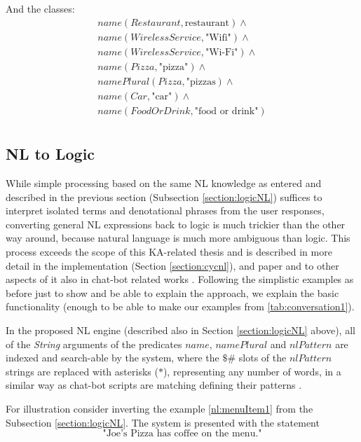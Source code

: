 And the classes:
\begin{equation}\label{as:nl:classes}
\begin{gathered}
    name(Restaurant, \text{restaurant}) \land \\
    name(WirelessService, \text{"Wifi"}) \land \\
    name(WirelessService, \text{"Wi-Fi"}) \land \\
	name(Pizza, \text{"pizza"}) \land \\
	namePlural(Pizza, \text{"pizzas}) \land \\
	name(Car, \text{"car"}) \land \\
	name(FoodOrDrink, \text{"food or drink"}) \\
\end{gathered}
\end{equation}

\subsection{NL to Logic}
\label{section:NLLogic}
While simple processing based on the same NL knowledge as entered and described
in the previous section (Subsection \ref{section:logicNL}) suffices to interpret 
isolated terms and denotational phrases from the user responses, converting 
general NL expressions back to logic is much trickier than the other way 
around, because natural language is much more ambiguous than logic. This 
process exceeds the scope of this KA-related thesis and is 
described in more detail in the implementation (Section \ref{section:cycnl}), 
and paper \parencite{Schneider2015} and to other aspects of it also in chat-bot related works \parencite{Wallace2013,Wilcox2011}. Following the simplistic examples as
before just to show and be able to explain the approach, we explain the basic 
functionality (enough to be able to make our examples from 
\autoref{tab:conversation1}).

In the proposed NL engine (described also in Section \ref{section:logicNL}
above), all of the \emph{String} arguments of the predicates $name$, 
$namePlural$ and $nlPattern$ are indexed and search-able by the system, where
the $\$\#$ slots of the $nlPattern$ strings are replaced with asterisks ($*$),
representing any number of words, in a similar way as chat-bot scripts are
matching defining their patterns \parencite{Wilcox2011}.

For illustration consider inverting the example \ref{nl:menuItem1} from the
Subsection \ref{section:logicNL}. The system is presented with the statement
\begin{equation}\label{nl:joespizzamenu}
\text{"Joe's Pizza has coffee on the menu."}
\end{equation}

